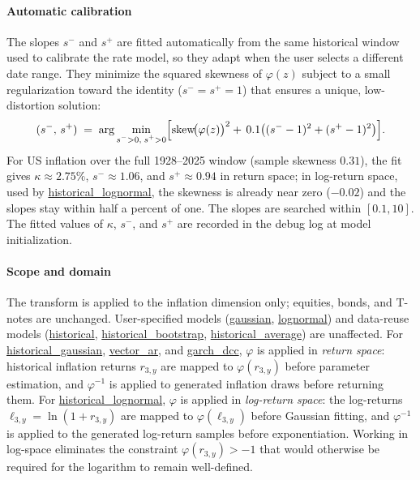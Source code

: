 \documentclass[fleqn,12pt]{report}
\newcommand{\code}[1]{\url{#1}}
\begin{document}
\paragraph*{Automatic calibration}
The slopes $s^-$ and $s^+$ are fitted automatically from the same historical
window used to calibrate the rate model, so they adapt when the user selects a
different date range.
They minimize the squared skewness of $\varphi(z)$ subject to a small
regularization toward the identity ($s^- = s^+ = 1$) that ensures a unique,
low-distortion solution:
\begin{equation}
    (s^-,\,s^+) \;=\;
    \arg\min_{\substack{s^->0,\;s^+>0}}
    \Bigl[
        \operatorname{skew}\!\bigl(\varphi(z)\bigr)^2
        +\, 0.1\bigl((s^{-}-1)^2 + (s^{+}-1)^2\bigr)
    \Bigr].
    \label{Eq:pwlfit}
\end{equation}
For US inflation over the full 1928--2025 window (sample skewness $0.31$),
the fit gives $\kappa \approx 2.75\%$, $s^- \approx 1.06$, and $s^+ \approx 0.94$ in return
space; in log-return space, used by \code{historical_lognormal}, the skewness is already
near zero ($-0.02$) and the slopes stay within half a percent of one.
The slopes are searched within $[0.1, 10]$.
The fitted values of $\kappa$, $s^-$, and $s^+$ are recorded in the debug
log at model initialization.

\paragraph*{Scope and domain}
The transform is applied to the inflation dimension only; equities, bonds,
and T-notes are unchanged.
User-specified models (\code{gaussian}, \code{lognormal}) and
data-reuse models (\code{historical}, \code{historical_bootstrap},
\code{historical_average}) are unaffected.
For \code{historical_gaussian}, \code{vector_ar}, and \code{garch_dcc},
$\varphi$ is applied in \emph{return space}: historical inflation returns
$r_{3,y}$ are mapped to $\varphi(r_{3,y})$ before parameter estimation,
and $\varphi^{-1}$ is applied to generated inflation draws before returning them.
For \code{historical_lognormal}, $\varphi$ is applied in
\emph{log-return space}: the log-returns $\ell_{3,y} = \ln(1+r_{3,y})$ are
mapped to $\varphi(\ell_{3,y})$ before Gaussian fitting, and $\varphi^{-1}$
is applied to the generated log-return samples before exponentiation.
Working in log-space eliminates the constraint $\varphi(r_{3,y})>-1$ that
would otherwise be required for the logarithm to remain well-defined.
\end{document}
